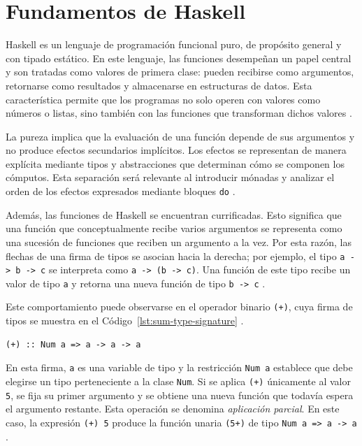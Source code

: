 
\section{Fundamentos de Haskell}
\label{sec:fundamentos-haskell}

\textsf{Haskell} es un lenguaje de programación funcional puro, de propósito general y con tipado estático. En este lenguaje, las funciones desempeñan un papel central y son tratadas como valores de primera clase: pueden recibirse como argumentos, retornarse como resultados y almacenarse en estructuras de datos. Esta característica permite que los programas no solo operen con valores como números o listas, sino también con las funciones que transforman dichos valores \cite[capítulo~1 y sección~6.1.6]{Haskell2010}.

La pureza implica que la evaluación de una función depende de sus argumentos y no produce efectos secundarios implícitos. Los efectos se representan de manera explícita mediante tipos y abstracciones que determinan cómo se componen los cómputos. Esta separación será relevante al introducir mónadas y analizar el orden de los efectos expresados mediante bloques \texttt{do} \cite[capítulo~7]{Haskell2010} \cite{Wadler1995}.

Además, las funciones de \textsf{Haskell} se encuentran currificadas. Esto significa que una función que conceptualmente recibe varios argumentos se representa como una sucesión de funciones que reciben un argumento a la vez. Por esta razón, las flechas de una firma de tipos se asocian hacia la derecha; por ejemplo, el tipo \verb|a -> b -> c| se interpreta como \verb|a -> (b -> c)|. Una función de este tipo recibe un valor de tipo \verb|a| y retorna una nueva función de tipo \verb|b -> c| \cite[secciones~3.3 y~4.1.2]{Haskell2010}.

Este comportamiento puede observarse en el operador binario \verb|(+)|, cuya firma de tipos se muestra en el Código~\ref{lst:sum-type-signature} \cite[sección~6.4 y figura~6.2]{Haskell2010}.

\begin{lstlisting}[style=haskell,caption={Firma de tipos del operador de suma \texttt{(+)}.},label={lst:sum-type-signature}]
    (+) :: Num a => a -> a -> a
\end{lstlisting}

En esta firma, \verb|a| es una variable de tipo y la restricción \verb|Num a| establece que debe elegirse un tipo perteneciente a la clase \texttt{Num}. Si se aplica \verb|(+)| únicamente al valor \verb|5|, se fija su primer argumento y se obtiene una nueva función que todavía espera el argumento restante. Esta operación se denomina \textit{aplicación parcial}. En este caso, la expresión \verb|(+) 5| produce la función unaria \verb|(5+)| de tipo \verb|Num a => a -> a| \cite[secciones~3.5, 4.1.3 y~6.4]{Haskell2010}.

